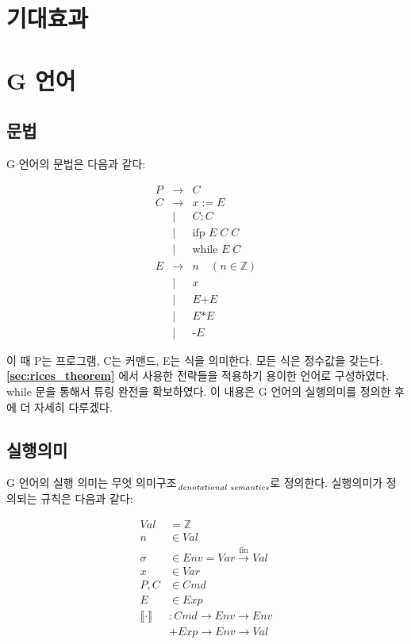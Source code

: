 \documentclass[ko]{snu-cse-bsc-thesis}
\newcommand{\alt}[2]{#1\textsubscript{\ensuremath{\text{\scriptsize\textit{#2}}}}}
\begin{document}
\chapter{기대효과}\label{chap:expected_effects}

\chapter{G 언어}\label{chap:g_language}
\section{문법}\label{sec:syntax}
G 언어의 문법은 다음과 같다:

\[
\begin{array}{rcl}
P & \rightarrow & C \\[1em]
C & \rightarrow & x := E \\
  & \mid & C ; C \\
  & \mid & \text{ifp } E \; C \; C \\
  & \mid & \text{while } E \; C \\[1em]
E & \rightarrow & n \quad (n \in \mathbb{Z}) \\
  & \mid & x \\
  & \mid & E \text{+} E \\
  & \mid & E \text{*} E \\
  & \mid & \text{-}E
\end{array}
\]

이 때 P는 프로그램, C는 커맨드, E는 식을 의미한다. 모든 식은 정수값을 갖는다.
\textbf{\eqref{sec:rices_theorem} } 에서 사용한 전략들을 적용하기 용이한 언어로 구성하였다. 
while 문을 통해서 튜링 완전을 확보하였다. 이 내용은 G 언어의 실행의미를 정의한 후에 더 자세히 다루겠다.

\section{실행의미}\label{sec:semantics}
G 언어의 실행 의미는 \alt{무엇 의미구조}{denotational semantics}로 정의한다. 실행의미가 정의되는 규칙은 다음과 같다:



\begin{align*}
  Val &= \mathbb{Z} \\
  n &\in Val \\
  \sigma &\in Env = Var \xrightarrow{\text{fin}} Val \\
  x &\in Var \\
  P, C &\in Cmd \\
  E &\in Exp \\
  \llbracket \cdot \rrbracket &: Cmd \rightarrow Env \rightarrow Env \\
  &+ Exp \rightarrow Env \rightarrow Val
\end{align*}
\end{document}
